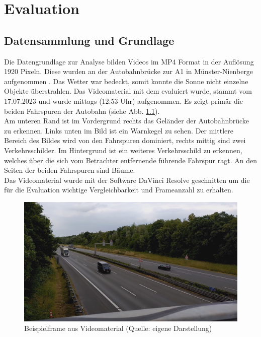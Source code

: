 \chapter{Evaluation}
\label{ch:Evaluation}
\section{Datensammlung und Grundlage}
{ \label{sec:datengrundlage}
	Die Datengrundlage zur Analyse bilden Videos im MP4 Format in der Auflösung 1920  Pixeln. Diese wurden an der Autobahnbrücke zur A1 in Münster-Nienberge aufgenommen \citep{GMaps}. Das Wetter war bedeckt, somit konnte die Sonne nicht einzelne Objekte überstrahlen. Das Videomaterial mit dem evaluiert wurde, stammt vom 17.07.2023 und wurde mittags (12:53 Uhr) aufgenommen. Es zeigt primär die beiden Fahrspuren der Autobahn (siehe Abb. \ref{Bsp_Evaluations_Vidmat}). \\
	Am unteren Rand ist im Vordergrund rechts das Geländer der Autobahnbrücke zu erkennen. Links unten im Bild ist ein Warnkegel zu sehen. Der mittlere Bereich des Bildes wird von den Fahrspuren dominiert, rechts mittig sind zwei Verkehrsschilder. Im Hintergrund ist ein weiteres Verkehrsschild zu erkennen, welches über die sich vom Betrachter entfernende führende Fahrspur ragt. An den Seiten der beiden Fahrspuren sind Bäume. \\
	Das Videomaterial wurde mit der Software DaVinci Resolve \citep{davinciresolve} geschnitten um die für die Evaluation wichtige Vergleichbarkeit und Frameanzahl zu erhalten.
	\begin{figure}[ht]
		\centering
		\includegraphics*[scale = 0.35, keepaspectratio ]{images/Evaluation/Screenshot_Video_A10s.png}
		\caption[Beispielframe aus Videomaterial]{Beispielframe aus Videomaterial (Quelle: eigene Darstellung)} 
		\label{Bsp_Evaluations_Vidmat}
 \end{figure}
}



